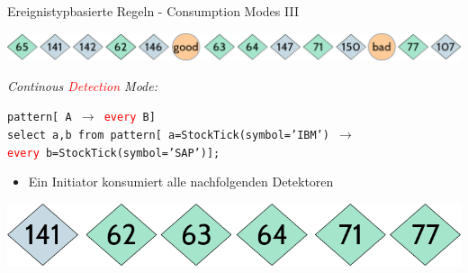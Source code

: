 \documentclass[usenames,dvipsnames]{beamer}
\begin{document}
\begin{frame}{Ereignistypbasierte Regeln - Consumption Modes III}
\begin{center}
    \includegraphics[scale=0.4]{img/stream-2}
\end{center}
\begin{exampleblock}{\textit{Continous \textcolor{red}{Detection} Mode:}}
    \begin{center}
        \texttt{pattern[  A $\rightarrow$ \textcolor{red}{every} B]}\\\vspace{0.3cm}
        \texttt{select a,b from pattern[ a=StockTick(symbol='IBM')
            $\rightarrow$\\ \textcolor{red}{every} b=StockTick(symbol='SAP')];}
    \end{center}
    \begin{itemize}
        \item Ein Initiator konsumiert alle nachfolgenden Detektoren
    \end{itemize}
\end{exampleblock}

\begin{center}
    \includegraphics[scale=0.3]{img/solution-e}
\end{center}
\end{frame}
\end{document}
